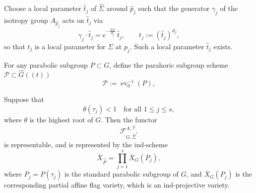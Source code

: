 \documentclass[12pt]{article}
\begin{document}
Choose a local parameter \(\widehat t_j\) of \(\widehat\Sigma\) around \(\widehat p_j\)
such that the generator \(\gamma_j\) of the isotropy group \(A_{\widehat p_j}\)
acts on \(\widehat t_j\) via
\begin{equation}
\gamma_j \cdot \widehat t_j
=
e^{-\frac{2\pi i}{d_j}}\, \widehat t_j,
\qquad
t_j := (\widehat t_j)^{d_j},
\end{equation}
so that \(t_j\) is a local parameter for \(\Sigma\) at \(p_j\).
Such a local parameter \(\widehat t_j\) exists.


For any parabolic subgroup \(P \subset G\), define the parahoric subgroup scheme $\mathcal P \subset \widehat G((t))$
\begin{equation}
\mathcal P := \operatorname{ev}_0^{-1}(P),
\end{equation}
\begin{theorem}
Suppose that
\[
\theta(\tau_j) < 1 \quad \text{for all } 1 \le j \le s,
\]
where \(\theta\) is the highest root of \(G\).
Then the functor
\[
\mathcal F^{A,\vec\tau}_{G,\widehat\Sigma^*}
\]
is representable, and is represented by the ind-scheme 
\[
\overline X_{\vec P}
=
\prod_{j=1}^s \overline X_G(P_j),
\]
where \(P_j = P(\tau_j)\) is the standard parabolic subgroup of \(G\),
and \(\overline X_G(P_j)\) is the corresponding partial affine flag variety,
which is an ind-projective variety.
\end{theorem}
\end{document}
